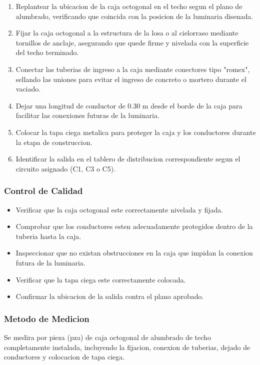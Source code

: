 \begin{enumerate}
  \item Replantear la ubicacion de la caja octogonal en el techo segun el plano de alumbrado, verificando que coincida con la posicion de la luminaria disenada.
  \item Fijar la caja octogonal a la estructura de la losa o al cielorraso mediante tornillos de anclaje, asegurando que quede firme y nivelada con la superficie del techo terminado.
  \item Conectar las tuberias de ingreso a la caja mediante conectores tipo "romex", sellando las uniones para evitar el ingreso de concreto o mortero durante el vaciado.
  \item Dejar una longitud de conductor de 0.30 m desde el borde de la caja para facilitar las conexiones futuras de la luminaria.
  \item Colocar la tapa ciega metalica para proteger la caja y los conductores durante la etapa de construccion.
  \item Identificar la salida en el tablero de distribucion correspondiente segun el circuito asignado (C1, C3 o C5).
\end{enumerate}

\subsubsection{Control de Calidad}

\begin{itemize}
  \item Verificar que la caja octogonal este correctamente nivelada y fijada.
  \item Comprobar que los conductores esten adecuadamente protegidos dentro de la tuberia hasta la caja.
  \item Inspeccionar que no existan obstrucciones en la caja que impidan la conexion futura de la luminaria.
  \item Verificar que la tapa ciega este correctamente colocada.
  \item Confirmar la ubicacion de la salida contra el plano aprobado.
\end{itemize}

\subsubsection{Metodo de Medicion}

Se medira por pieza (pza) de caja octogonal de alumbrado de techo completamente instalada, incluyendo la fijacion, conexion de tuberias, dejado de conductores y colocacion de tapa ciega.

